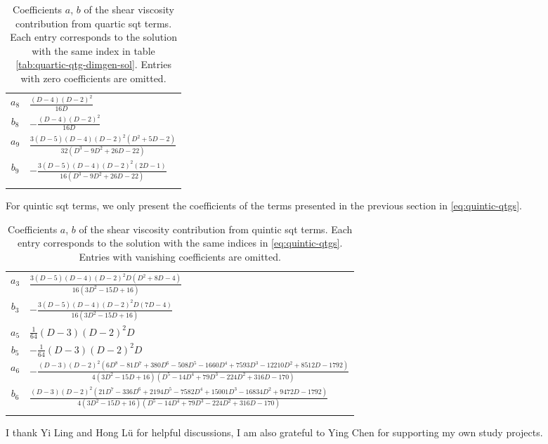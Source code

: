 \documentclass[a4paper,11pt]{article}
\begin{document}
\begin{longtable}{|c|l|}
    \hline
    $a_{8}$ & $\frac{(D-4) (D-2)^2}{16 D}$ \\$b_{8}$ & $-\frac{(D-4) (D-2)^2}{16 D}$\\
    \hline
    $a_{9}$ & $\frac{3 (D-5) (D-4) (D-2)^2 \left(D^2+5 D-2\right)}{32 \left(D^3-9 D^2+26 D-22\right)}$ \\$b_{9}$ & $-\frac{3 (D-5) (D-4) (D-2)^2 (2 D-1)}{16 \left(D^3-9 D^2+26 D-22\right)}$\\
    \hline
    \caption{Coefficients $a$, $b$ of the shear viscosity contribution from quartic \ac{sqt} terms. Each entry corresponds to the solution with the same index in table \ref{tab:quartic-qtg-dimgen-sol}. Entries with zero coefficients are omitted.}
    \label{tab:quartic-sv-coefs}
\end{longtable}
For quintic \ac{sqt} terms, we only present the coefficients of the terms presented in the previous section in \eqref{eq:quintic-qtgs}.
\begin{longtable}{|c|l|}
    \hline
    $a_{3}$ & $\frac{3 (D-5) (D-4) (D-2)^2 D \left(D^2+8 D-4\right)}{16 \left(3 D^2-15 D+16\right)}$ \\$b_{3}$ & $-\frac{3 (D-5) (D-4) (D-2)^2 D (7 D-4)}{16 \left(3 D^2-15 D+16\right)}$\\
    \hline
    $a_{5}$ & $\frac{1}{64} (D-3) (D-2)^2 D$ \\$b_{5}$ & $-\frac{1}{64} (D-3) (D-2)^2 D$\\
    \hline
    $a_{6}$ & $-\frac{(D-3) (D-2)^2 \left(6 D^8-81 D^7+380 D^6-508 D^5-1660 D^4+7593 D^3-12210 D^2+8512 D-1792\right)}{4 \left(3 D^2-15 D+16\right) \left(D^5-14 D^4+79 D^3-224 D^2+316 D-170\right)}$ \\$b_{6}$ & $\frac{(D-3) (D-2)^2 \left(21 D^7-336 D^6+2194 D^5-7582 D^4+15001 D^3-16834 D^2+9472 D-1792\right)}{4 \left(3 D^2-15 D+16\right) \left(D^5-14 D^4+79 D^3-224 D^2+316 D-170\right)}$\\
    \hline
    \caption{Coefficients $a$, $b$ of the shear viscosity contribution from quintic \ac{sqt} terms. Each entry corresponds to the solution with the same indices in \eqref{eq:quintic-qtgs}. Entries with vanishing coefficients are omitted.}
    \label{tab:quintic-sv-coefs}
\end{longtable}

\acknowledgments
I thank Yi Ling and Hong Lü for helpful discussions, I am also grateful to Ying Chen for supporting my own study projects.


\end{document}
